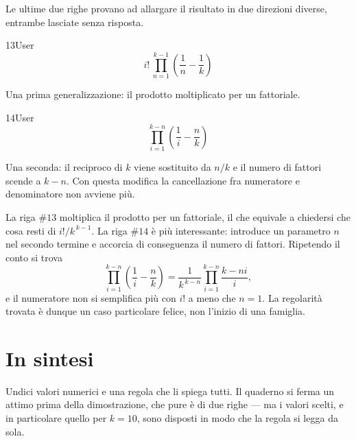Le ultime due righe provano ad allargare il risultato in due direzioni diverse, entrambe lasciate senza risposta.

\begin{espr}{13}{User}{}
\[
i!\, \prod_{n=1}^{k - 1} \left(\frac{1}{n} - \frac{1}{k}\right)
\]
\end{espr}
Una prima generalizzazione: il prodotto moltiplicato per un fattoriale.

\begin{espr}{14}{User}{}
\[
\prod_{i=1}^{k - n} \left(\frac{1}{i} - \frac{n}{k}\right)
\]
\end{espr}
Una seconda: il reciproco di $k$ viene sostituito da $n/k$ e il numero di fattori scende a $k-n$. Con questa modifica la cancellazione fra numeratore e denominatore non avviene più.


La riga $\#13$ moltiplica il prodotto per un fattoriale, il che equivale a chiedersi che cosa resti di $i!/k^{\,k-1}$. La riga $\#14$ è più interessante: introduce un parametro $n$ nel secondo termine e accorcia di conseguenza il numero di fattori. Ripetendo il conto si trova
\[
  \prod_{i=1}^{k-n}\left(\frac1i-\frac nk\right)
  =\frac{1}{k^{\,k-n}}\prod_{i=1}^{k-n}\frac{k-ni}{i},
\]
e il numeratore non si semplifica più con $i!$ a meno che $n=1$. La regolarità trovata è dunque un caso particolare felice, non l'inizio di una famiglia.

\section*{In sintesi}

Undici valori numerici e una regola che li spiega tutti. Il quaderno si ferma un attimo prima della dimostrazione, che pure è di due righe — ma i valori scelti, e in particolare quello per $k=10$, sono disposti in modo che la regola si legga da sola.

